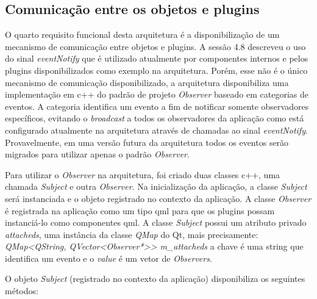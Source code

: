\subsection{Comunicação entre os objetos e plugins}
O quarto requisito funcional desta arquitetura é a disponibilização de um mecanismo de comunicação entre objetos e plugins.
A sessão 4.8 descreveu o uso do sinal \textit{eventNotify} que é utilizado atualmente por componentes internos e pelos plugins disponibilizados como exemplo na arquitetura. Porém, esse não é o único mecanismo de comunicação disponibilizado, a arquitetura disponibiliza uma implementação em c++ do padrão de projeto \textit{Observer} baseado em categorias de eventos. A categoria identifica um evento a fim de notificar somente observadores específicos, evitando o \textit{broadcast} a todos os observadores da aplicação como está configurado atualmente na arquitetura através de chamadas ao sinal \textit{eventNotify}. Provavelmente, em uma versão futura da arquitetura todos os eventos serão migrados para utilizar apenas o padrão \textit{Observer}.\par

Para utilizar o \textit{Observer} na arquitetura, foi criado duas classes c++, uma chamada \textit{Subject} e outra \textit{Observer}. Na inicialização da aplicação, a classe \textit{Subject} será instanciada e o objeto registrado no contexto da aplicação. A classe \textit{Observer} é registrada na aplicação como um tipo qml para que os plugins possam instanciá-lo como componentes qml. A classe \textit{Subject} possui um atributo privado \textit{attacheds}, uma instância da classe \textit{QMap} do Qt, mais precisamente: \textit{QMap<QString, QVector<Observer*>> m\_attacheds} a chave é uma string que identifica um evento e o \textit{value} é um vetor de \textit{Observers}.

O objeto \textit{Subject} (registrado no contexto da aplicação) disponibiliza os seguintes métodos:

